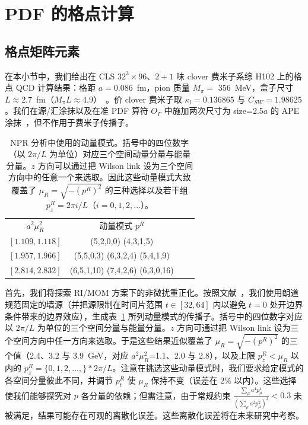 \section{PDF 的格点计算}\label{sec:numerical}

\subsection{格点矩阵元素}\label{subsec:ME}

在本小节中，我们给出在 CLS $32^3\times96$、$2+1$ 味 clover 费米子系综 H102 上的格点 QCD 计算结果：格距 $a=0.086$~fm，pion 质量 $M_\pi=$ 356~MeV，盒子尺寸 $L\approx 2.7$~fm（$M_\pi L\approx 4.9$）~\cite{Bruno:2014jqa}。价 clover 费米子取 $\kappa_l=0.136865$ 与 $C_{SW}=1.98625$。我们在源/汇涂抹以及在准 PDF 算符 $O_\Gamma$ 中施加两次尺寸为 size=2.5$a$ 的 APE 涂抹~\cite{Hasenfratz:2001hp}，但不作用于费米子传播子。

\begin{table}[htbp]
\begin{center}
\caption{\label{table:p_modes}
NPR 分析中使用的动量模式。括号中的四位数字（以 $2\pi/L$ 为单位）对应三个空间动量分量与能量分量。$z$ 方向可以通过把 Wilson link 设为三个空间方向中的任意一个来选取。因此这些动量模式大致覆盖了 $\mu_R=\sqrt{-(p^R)^2}$ 的三种选择以及若干组 $p^R_z= 2\pi i/L$（$i=0,1,2,...$）。}
\begin{tabular}{c|ccc}
\hline
$a^2\mu_R^2$ & 动量模式 $p^R$ \\
$ [1.109,1.118]$ &(5,2,0,0)   (4,3,1,5)   \\
$ [1.957,1.966]$ &(5,5,0,3)  (6,3,2,4)   (5,4,1,9) \\
$ [2.814,2.832]$ &(6,5,1,10)   (7,4,2,6)   (6,3,0,16)\\
\hline
\end{tabular}
\end{center}
\end{table}

首先，我们将探索 RI/MOM 方案下的非微扰重正化。按照文献~\cite{Chen:2017mzz}，我们使用朗道规范固定的墙源（并把源限制在时间片范围 $t\in[32, 64]$ 内以避免 $t=0$ 处开边界条件带来的边界效应），生成表~\ref{table:p_modes} 所列动量模式的传播子。括号中的四位数字对应以 $2\pi/L$ 为单位的三个空间分量与能量分量。$z$ 方向可通过把 Wilson link 设为三个空间方向中任一方向来选取。于是这些结果近似覆盖了 {$\mu_R=\sqrt{-(p^R)^2}$ 的三个值（2.4、3.2 与 3.9~GeV，对应 $a^2\mu_R^2$=1.1、2.0 与 2.8），以及上限 $p^R_z<\mu_R$ 以内的 $p^R_z=\{0,1,2,...,\}*2\pi /L$}。注意在挑选这些动量模式时，我们要求给定模式的各空间分量彼此不同，并调节 $p_t^R$ 使 $\mu_R$ 保持不变（误差在 2\% 以内）。这些选择使我们能够探究对 $p$ 各分量的依赖；但需注意，由于常规约束 $\frac{\sum_{\mu}a^4p_{\mu}^4}{(\sum_{\mu}a^2p_{\mu}^2)^2}<0.3$ 未被满足，结果可能存在可观的离散化误差。这些离散化误差将在未来研究中考察。

